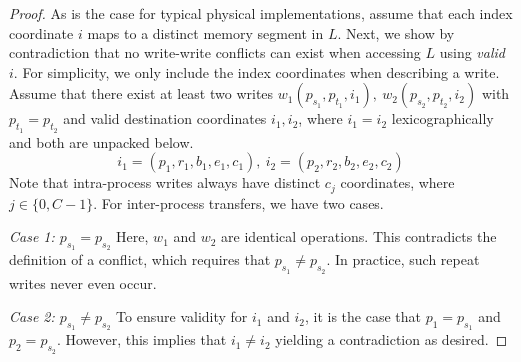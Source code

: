 \begin{proof}
    As is the case for typical physical implementations,
    assume that each index coordinate $i$ maps to a distinct memory segment in $L$.
    Next, we show by contradiction that no write-write conflicts can exist when accessing $L$ using \emph{valid} $i$.
    For simplicity, we only include the index coordinates when describing a write.
    Assume that there exist at least two writes $w_1(p_{s_1}, p_{t_1}, i_1),\>w_2(p_{s_2}, p_{t_2}, i_2)$
    with $p_{t_1} = p_{t_2}$ and valid destination coordinates
    $i_1, i_2$, where $i_1 = i_2$ lexicographically and both are unpacked below.
    \[
        i_1 = (p_1, r_1, b_1, e_1, c_1),\> i_2 = (p_2, r_2, b_2, e_2, c_2)
    \]
    Note that intra-process writes always have distinct $c_j$
    coordinates, where $j \in \{0, C - 1\}$.
    For inter-process transfers, we have two cases.

    \textit{Case 1: $p_{s_1} = p_{s_2}$}
    \newline Here, $w_1$ and $w_2$ are identical operations.
    This contradicts the definition of a conflict, which requires that $p_{s_1} \neq p_{s_2}$.
    In practice, such repeat writes never even occur.

    \textit{Case 2: $p_{s_1} \neq p_{s_2}$}
    \newline To ensure validity for $i_1$ and $i_2$, it is the case that $p_1 = p_{s_1}$ and $p_2 = p_{s_2}$.
    However, this implies that $i_1 \neq i_2$ yielding a contradiction as desired.
\end{proof}

